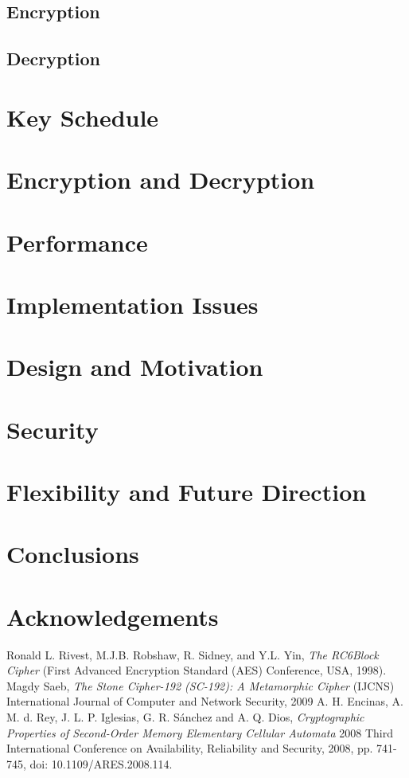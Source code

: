 \documentclass{article}
\begin{document}
\subsection{Encryption}

\subsection{Decryption}

\section{Key Schedule}

\section{Encryption and Decryption}

\section{Performance}

\section{Implementation Issues}

\section{Design and Motivation}

\section{Security}

\section{Flexibility and Future Direction}

\section{Conclusions}

\section{Acknowledgements}

\begin{thebibliography}{unsrt}
  Ronald L. Rivest, M.J.B. Robshaw, R. Sidney, and Y.L. Yin, \emph{The RC6\texttrademark Block Cipher} (First Advanced Encryption Standard (AES) Conference, USA, 1998).
  Magdy Saeb, \emph{The Stone Cipher-192 (SC-192): A Metamorphic Cipher} (IJCNS) International Journal of Computer and Network Security, 2009
  A. H. Encinas, A. M. d. Rey, J. L. P. Iglesias, G. R. Sánchez and A. Q. Dios, \emph{Cryptographic Properties of Second-Order Memory Elementary Cellular Automata} 2008 Third International Conference on Availability, Reliability and Security, 2008, pp. 741-745, doi: 10.1109/ARES.2008.114.
\end{thebibliography}
\end{document}

